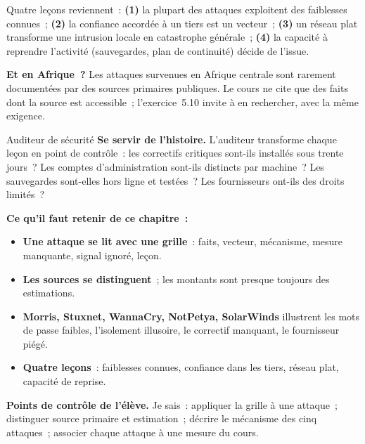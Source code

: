 Quatre leçons reviennent~: \textbf{(1)} la plupart des attaques exploitent
des faiblesses connues~; \textbf{(2)} la confiance accordée à un tiers est
un vecteur~; \textbf{(3)} un réseau plat transforme une intrusion locale en
catastrophe générale~; \textbf{(4)} la capacité à reprendre l'activité
(sauvegardes, plan de continuité) décide de l'issue.

\begin{boxinfo}
\textbf{Et en Afrique~?} Les attaques survenues en Afrique centrale sont
rarement documentées par des sources primaires publiques. Le cours ne
cite que des faits dont la source est accessible~; l'exercice~5.10
invite à en rechercher, avec la même exigence.
\end{boxinfo}

\begin{boxmetier}{Auditeur de sécurité}
\textbf{Se servir de l'histoire.} L'auditeur transforme chaque leçon en
point de contrôle~: les correctifs critiques sont-ils installés sous
trente jours~? Les comptes d'administration sont-ils distincts par
machine~? Les sauvegardes sont-elles hors ligne et testées~? Les
fournisseurs ont-ils des droits limités~?
\end{boxmetier}

\separateur

\begin{boxresume}
\textbf{Ce qu'il faut retenir de ce chapitre~:}
\begin{itemize}
    \item \textbf{Une attaque se lit avec une grille}~: faits, vecteur,
          mécanisme, mesure manquante, signal ignoré, leçon.
    \item \textbf{Les sources se distinguent}~; les montants sont presque
          toujours des estimations.
    \item \textbf{Morris, Stuxnet, WannaCry, NotPetya, SolarWinds}
          illustrent les mots de passe faibles, l'isolement illusoire, le
          correctif manquant, le fournisseur piégé.
    \item \textbf{Quatre leçons}~: faiblesses connues, confiance dans les
          tiers, réseau plat, capacité de reprise.
\end{itemize}
\end{boxresume}

\begin{boxinfo}
\textbf{Points de contrôle de l'élève.} Je sais~: appliquer la grille à une
attaque~; distinguer source primaire et estimation~; décrire le mécanisme
des cinq attaques~; associer chaque attaque à une mesure du cours.
\end{boxinfo}

